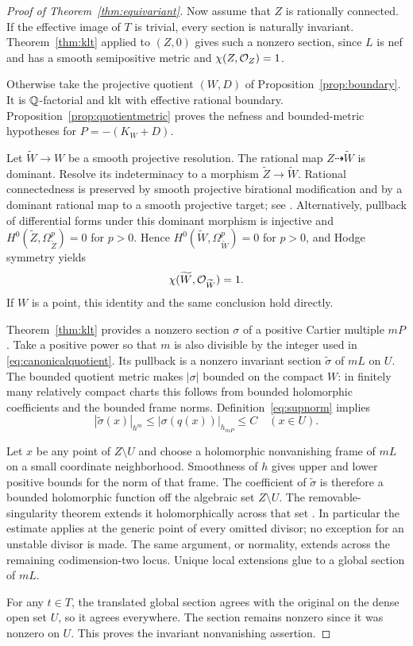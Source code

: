 \begin{proof}[Proof of Theorem~\ref{thm:equivariant}]
Now assume that $Z$ is rationally connected. If the effective image of $T$ is trivial, every section is naturally invariant. Theorem~\ref{thm:klt} applied to $(Z,0)$ gives such a nonzero section, since $L$ is nef and has a smooth semipositive metric and $\chi(Z,\mathcal O_Z)=1$.

Otherwise take the projective quotient $(W,D)$ of Proposition~\ref{prop:boundary}. It is $\mathbb Q$-factorial and klt with effective rational boundary. Proposition~\ref{prop:quotientmetric} proves the nefness and bounded-metric hypotheses for $P=-(K_W+D)$.

Let $\widetilde W\to W$ be a smooth projective resolution. The rational map $Z\dashrightarrow\widetilde W$ is dominant. Resolve its indeterminacy to a morphism $\widetilde Z\to\widetilde W$. Rational connectedness is preserved by smooth projective birational modification and by a dominant rational map to a smooth projective target; see \cite{Kollar1996}. Alternatively, pullback of differential forms under this dominant morphism is injective and $H^0(\widetilde Z,\Omega^p_{\widetilde Z})=0$ for $p>0$. Hence $H^0(\widetilde W,\Omega^p_{\widetilde W})=0$ for $p>0$, and Hodge symmetry yields
\[
\chi(\widetilde W,\mathcal O_{\widetilde W})=1.
\]
If $W$ is a point, this identity and the same conclusion hold directly.

Theorem~\ref{thm:klt} provides a nonzero section $\sigma$ of a positive Cartier multiple $mP$. Take a positive power so that $m$ is also divisible by the integer used in \eqref{eq:canonicalquotient}. Its pullback is a nonzero invariant section $\widetilde\sigma$ of $mL$ on $U$. The bounded quotient metric makes $|\sigma|$ bounded on the compact $W$: in finitely many relatively compact charts this follows from bounded holomorphic coefficients and the bounded frame norms. Definition~\eqref{eq:supnorm} implies
\begin{equation}\label{eq:extensionbound}
|\widetilde\sigma(x)|_{h^m}
\le |\sigma(q(x))|_{h_{mP}}\le C
\quad (x\in U).
\end{equation}

Let $x$ be any point of $Z\setminus U$ and choose a holomorphic nonvanishing frame of $mL$ on a small coordinate neighborhood. Smoothness of $h$ gives upper and lower positive bounds for the norm of that frame. The coefficient of $\widetilde\sigma$ is therefore a bounded holomorphic function off the algebraic set $Z\setminus U$. The removable-singularity theorem extends it holomorphically across that set \cite[Chapter~I, Corollary~5.25]{Demailly2012}. In particular the estimate applies at the generic point of every omitted divisor; no exception for an unstable divisor is made. The same argument, or normality, extends across the remaining codimension-two locus. Unique local extensions glue to a global section of $mL$.

For any $t\in T$, the translated global section agrees with the original on the dense open set $U$, so it agrees everywhere. The section remains nonzero since it was nonzero on $U$. This proves the invariant nonvanishing assertion.
\end{proof}

